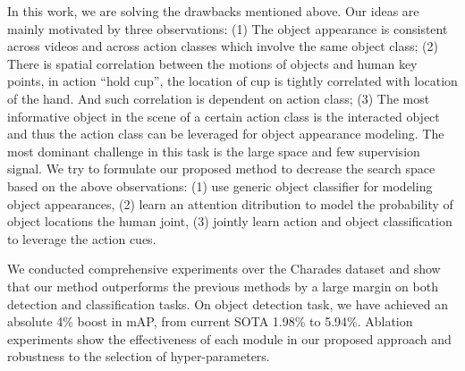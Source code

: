 In this work, we are solving the drawbacks mentioned above. Our ideas are mainly motivated by three observations: (1) The object appearance is consistent across videos and across action classes which involve the same object class; (2) There is spatial correlation between the motions of objects and human key points, \eg in action ``hold cup'', the location of cup is tightly correlated with location of the hand. And such correlation is dependent on action class; (3) The most informative object in the scene of a certain action class is the interacted object and thus the action class can be leveraged for object appearance modeling. The most dominant challenge in this task is the large space and few supervision signal. We try to formulate our proposed method to decrease the search space based on the above observations: (1) use generic object classifier for modeling object appearances, (2) learn an attention ditribution to model the probability of object locations \wrt the human joint, (3) jointly learn action and object classification to leverage the action cues.

We conducted comprehensive experiments over the Charades dataset \cite{sigurdsson2016hollywood} and show that our method outperforms the previous methods \cite{bilen2016weakly,yuan2017temporal} by a large margin on both detection and classification tasks. On object detection task, we have achieved an absolute 4\% boost in mAP, from current SOTA 1.98\% to 5.94\%. Ablation experiments show the effectiveness of each module in our proposed approach and robustness to the selection of hyper-parameters.
